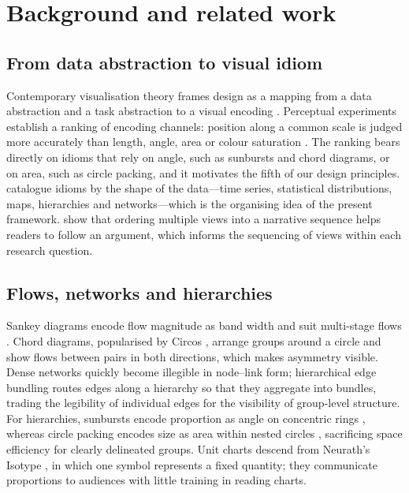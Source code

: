 \documentclass[11pt,a4paper]{article}
\begin{document}
\section{Background and related work}\label{sec:related}

\subsection{From data abstraction to visual idiom}
Contemporary visualisation theory frames design as a mapping from a data abstraction and a task abstraction
to a visual encoding \citep{munzner2014}. Perceptual experiments establish a ranking of encoding channels:
position along a common scale is judged more accurately than length, angle, area or colour saturation
\citep{cleveland1984}. The ranking bears directly on idioms that rely on angle, such as sunbursts and chord
diagrams, or on area, such as circle packing, and it motivates the fifth of our design principles.
\citet{heer2010zoo} catalogue idioms by the shape of the data---time series, statistical distributions,
maps, hierarchies and networks---which is the organising idea of the present framework. \citet{segel2010}
show that ordering multiple views into a narrative sequence helps readers to follow an argument, which informs
the sequencing of views within each research question.

\subsection{Flows, networks and hierarchies}
Sankey diagrams encode flow magnitude as band width and suit multi-stage flows \citep{riehmann2005}. Chord
diagrams, popularised by Circos \citep{krzywinski2009}, arrange groups around a circle and show flows
between pairs in both directions, which makes asymmetry visible. Dense networks quickly become illegible in
node--link form; hierarchical edge bundling \citep{holten2006} routes edges along a hierarchy so that they
aggregate into bundles, trading the legibility of individual edges for the visibility of group-level
structure. For hierarchies, sunbursts encode proportion as angle on concentric rings \citep{stasko2000},
whereas circle packing encodes size as area within nested circles \citep{wang2006}, sacrificing space
efficiency for clearly delineated groups. Unit charts descend from Neurath's Isotype \citep{neurath1936}, in
which one symbol represents a fixed quantity; they communicate proportions to audiences with little
training in reading charts.
\end{document}
